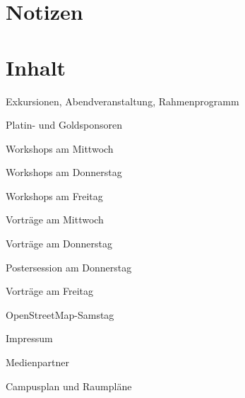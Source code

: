 \section*{Notizen}

\newpage
{}
\section*{Inhalt}
\label{contents}
\newlength\contentspace
\setlength\contentspace{0.2em}

\vspace*{\contentspace}%
\noindent Exkursionen, Abendveranstaltung, Rahmenprogramm  \dotfill \pageref{exkursionen}

\vspace*{\contentspace}%
\noindent Platin- und Goldsponsoren \dotfill \pageref{platinsposoren}

\vspace*{\contentspace}%
\noindent Workshops am Mittwoch \dotfill \pageref{mittwoch-workshops}

\vspace*{\contentspace}%
\noindent Workshops am Donnerstag \dotfill \pageref{donnerstag-workshops}

\vspace*{\contentspace}%
\noindent Workshops am Freitag \dotfill \pageref{freitag-workshops}

\vspace*{\contentspace}%
\noindent Vorträge am Mittwoch \dotfill \pageref{mittwoch}

\vspace*{\contentspace}%
\noindent Vorträge am Donnerstag \dotfill \pageref{donnerstag}

\vspace*{\contentspace}%
\noindent Postersession am Donnerstag \dotfill \pageref{donnerstag-poster}

\vspace*{\contentspace}%
\noindent Vorträge am Freitag \dotfill \pageref{freitag}

\vspace*{\contentspace}%
\noindent OpenStreetMap-Samstag \dotfill \pageref{samstag}

\vspace*{\contentspace}%
\noindent Impressum \dotfill \pageref{impressum}

\vspace*{\contentspace}%
\noindent Medienpartner \dotfill \pageref{medienpartner}

\vspace*{\contentspace}%
\noindent Campusplan und Raumpläne \dotfill \pageref{kartenseiten}

\justifying

\newpage

